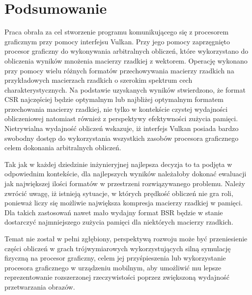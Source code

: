 \chapter{Podsumowanie}
\label{cha:podsumowanie}

Praca obrała za cel stworzenie programu komunikującego się z procesorem graficznym przy pomocy interfejsu Vulkan.
Przy jego pomocy zaprzęgnięto procesor graficzny do wykonywania arbitralnych obliczeń, które wykorzystano do obliczenia wyników mnożenia macierzy rzadkiej z wektorem.
Operację wykonano przy pomocy wielu różnych formatów przechowywania macierzy rzadkich na przykładowych macierzach rzadkich o szerokim spektrum cech charakterystycznych.
Na podstawie uzyskanych wyników stwierdzono, że format CSR najczęściej będzie optymalnym lub najbliżej optymalnym formatem przechowania macierzy rzadkiej, nie tylko w kontekście czystej wydajności obliczeniowej natomiast również z perspektywy efektywności zużycia pamięci.
Nietrywialna wydajność obliczeń wskazuje, iż interfejs Vulkan posiada bardzo swobodny dostęp do wykorzystania wszystkich zasobów procesora graficznego celem dokonania arbitralnych obliczeń.

Tak jak w każdej dziedzinie inżynieryjnej najlepsza decyzja to ta podjęta w odpowiednim kontekście, dla najlepszych wyników należałoby dokonać ewaluacji jak największej ilości formatów w przestrzeni rozwiązywanego problemu.
Należy zwrócić uwagę, iż istnieją sytuacje, w których prędkość obliczeń nie gra roli, ponieważ liczy się możliwie największa kompresja macierzy rzadkiej w pamięci.
Dla takich zastosowań nawet mało wydajny format BSR będzie w stanie dostarczyć najmniejszego zużycia pamięci dla niektórych macierzy rzadkich.

Temat nie został w pełni zgłębiony, perspektywą rozwoju może być przeniesienie części obliczeń w grach trójwymiarowych wykorzystujących silną symulację fizyczną na procesor graficzny, celem jej przyśpieszenia lub wykorzystanie procesora graficznego w urządzeniu mobilnym, aby umożliwić mu lepsze reprezentowanie rozszerzonej rzeczywistości poprzez zwiększoną wydajność przetwarzania obrazów.